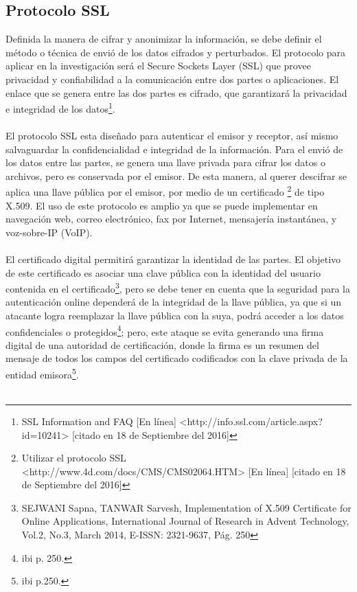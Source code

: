 \documentclass[a4paper,openright,12pt]{book}
\theoremstyle{definition}
\theoremstyle{remark}
\begin{document}
    \subsection{Protocolo SSL}
Definida la manera de cifrar y anonimizar la información, se debe definir el método o técnica de envió de los datos cifrados y perturbados. El protocolo para aplicar en la investigación será el Secure Sockets Layer (SSL) que provee privacidad y confiabilidad a la comunicación entre dos partes o aplicaciones. El enlace que se genera entre las dos partes es cifrado, que garantizará la privacidad e integridad de los datos\footnote{ SSL Information and FAQ [En línea] <http://info.ssl.com/article.aspx?id=10241> [citado en 18 de Septiembre del 2016]}.\\\\
El protocolo SSL esta diseñado para autenticar el emisor y receptor, así mismo salvaguardar la confidencialidad e integridad de la información. Para el envió de los datos entre las partes, se genera una llave privada para cifrar los datos o archivos, pero es conservada por el emisor. De esta manera, al querer descifrar se aplica una llave pública por el emisor, por medio de un certificado \footnote{Utilizar el protocolo SSL <http://www.4d.com/docs/CMS/CMS02064.HTM> [En línea] [citado en 18 de Septiembre del 2016]} de tipo X.509. El uso de este protocolo es amplio ya que se puede implementar en  navegación web, correo electrónico, fax por Internet, mensajería instantánea, y voz-sobre-IP (VoIP).\\\\
El certificado digital permitirá garantizar la identidad de las partes. El objetivo de este certificado es asociar una clave pública con la identidad del usuario contenida en el certificado\footnote{SEJWANI Sapna, TANWAR Sarvesh, Implementation of X.509 Certificate for Online Applications, International Journal of Research in Advent Technology, Vol.2, No.3, March 2014, E-ISSN: 2321-9637, Pág. 250}, pero se debe tener en cuenta que la seguridad para la autenticación online dependerá de la integridad de la llave pública, ya que si un atacante logra reemplazar la llave pública con la suya, podrá acceder a los datos confidenciales o protegidos\footnote{ibi p. 250.}; pero, este ataque se evita generando una firma digital de una autoridad de certificación, donde la firma es un resumen del mensaje de todos los campos del certificado codificados con la clave privada de la entidad emisora\footnote{ibi p.250.}.\\\\
\end{document}

